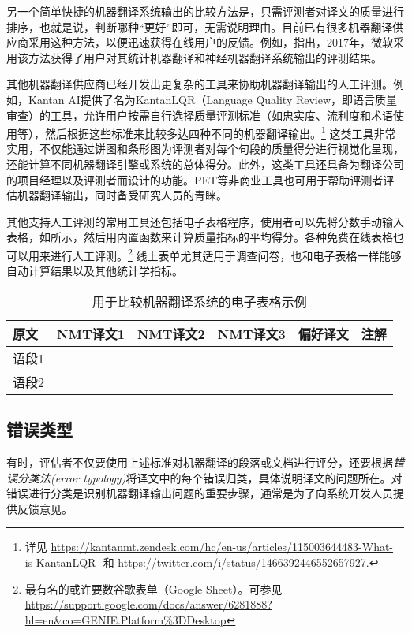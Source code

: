 \documentclass[output=paper]{langscibook}
\begin{document}
另一个简单快捷的机器翻译系统输出的比较方法是，只需评测者对译文的质量进行排序，也就是说，判断哪种“更好”即可，无需说明理由。目前已有很多机器翻译供应商采用这种方法，以便迅速获得在线用户的反馈。例如，\citet{Moorkens2018}指出，2017年，微软采用该方法获得了用户对其统计机器翻译和神经机器翻译系统输出的评测结果。

其他机器翻译供应商已经开发出更复杂的工具来协助机器翻译输出的人工评测。例如，Kantan AI提供了名为KantanLQR（Language Quality Review，即语言质量审查）的工具，允许用户按需自行选择质量评测标准（如忠实度、流利度和术语使用等），然后根据这些标准来比较多达四种不同的机器翻译输出。\footnote{详见 \url{https://kantanmt.zendesk.com/hc/en-us/articles/115003644483-What-is-KantanLQR-} 和 \url{https://twitter.com/i/status/1466392446552657927}.} 这类工具非常实用，不仅能通过饼图和条形图为评测者对每个句段的质量得分进行视觉化呈现，还能计算不同机器翻译引擎或系统的总体得分。此外，这类工具还具备为翻译公司的项目经理以及评测者而设计的功能。PET\citep{AzizSpecia2012}等非商业工具也可用于帮助评测者评估机器翻译输出，同时备受研究人员的青睐。

其他支持人工评测的常用工具还包括电子表格程序，使用者可以先将分数手动输入表格，如所示，然后用内置函数来计算质量指标的平均得分。各种免费在线表格也可以用来进行人工评测。\footnote{最有名的或许要数谷歌表单（Google Sheet）。可参见 \url{https://support.google.com/docs/answer/6281888?hl=en\&co=GENIE.Platform\%3DDesktop}} 线上表单尤其适用于调查问卷，也和电子表格一样能够自动计算结果以及其他统计学指标。

\begin{table}
\begin{tabularx}{\textwidth}{|l|X|X|X|l|l|}
\hline
{原文} & {NMT译文1} & {NMT译文2} & {NMT译文3} & {偏好译文} & {注解}\\
\hline
语段1 &  &  &  &  &\\
\hline
语段2 &  &  &  &  & \\
\hline
\end{tabularx}
\caption{用于比较机器翻译系统的电子表格示例}
\label{tab:rossi:3}
\end{table}

\subsection{错误类型}

有时，评估者不仅要使用上述标准对机器翻译的段落或文档进行评分，还要根据\textit{错误分类法(error typology)}将译文中的每个错误归类，具体说明译文的问题所在。对错误进行分类是识别机器翻译输出问题的重要步骤，通常是为了向系统开发人员提供反馈意见。
\end{document}
